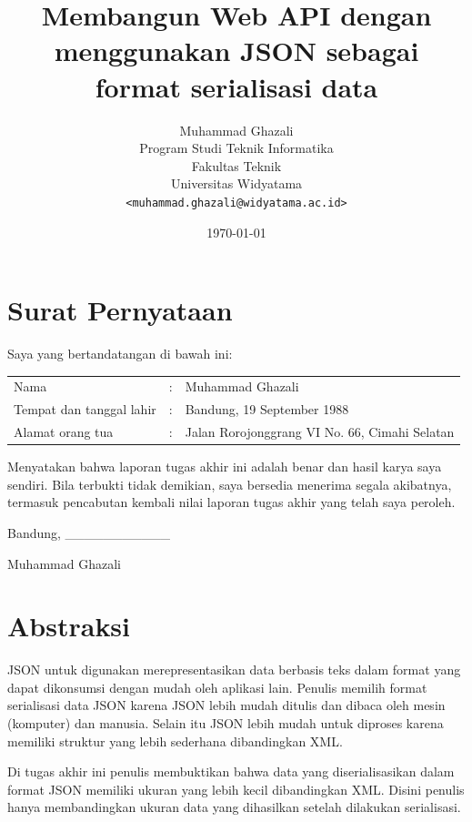 \documentclass[a4paper, 12pt, oneside]{report}
\title{\textbf{Membangun Web API dengan menggunakan JSON sebagai format serialisasi data}}
\author{
Muhammad Ghazali\\
Program Studi Teknik Informatika\\
Fakultas Teknik\\
Universitas Widyatama
\\\texttt{<muhammad.ghazali@widyatama.ac.id>}
}
\date{\today}
\begin{document}
\maketitle

\chapter*{Surat Pernyataan}

\onehalfspacing Saya yang bertandatangan di bawah ini:

\begin{tabular}{lll}
Nama & : & Muhammad Ghazali\\
Tempat dan tanggal lahir & : & Bandung, 19 September 1988\\
Alamat orang tua & : & Jalan Rorojonggrang VI No. 66, Cimahi Selatan\\
\end{tabular}

\onehalfspacing Menyatakan bahwa laporan tugas akhir ini adalah benar dan hasil karya saya sendiri. Bila terbukti tidak demikian, saya bersedia menerima segala akibatnya, termasuk pencabutan kembali nilai laporan tugas akhir yang telah saya peroleh.

\begin{flushright}
Bandung, \_\_\_\_\_\_\_\_\_\_\_

Muhammad Ghazali

\end{flushright}

\chapter*{Abstraksi}

\onehalfspacing JSON untuk digunakan merepresentasikan data berbasis teks dalam format yang dapat dikonsumsi dengan mudah oleh aplikasi lain. Penulis memilih format serialisasi data JSON karena JSON lebih mudah ditulis dan dibaca oleh mesin (komputer) dan manusia. Selain itu JSON lebih mudah untuk diproses karena memiliki struktur yang lebih sederhana dibandingkan XML\cite{json-fat-free}\cite{json-vs-xml-debate}. 

\onehalfspacing Di tugas akhir ini penulis membuktikan bahwa data yang diserialisasikan dalam format JSON memiliki ukuran yang lebih kecil dibandingkan XML. Disini penulis hanya membandingkan ukuran data yang dihasilkan setelah dilakukan serialisasi.
\end{document}
